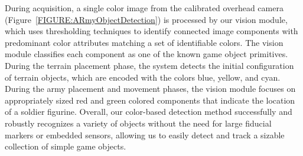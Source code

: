 \documentclass[10pt,twocolumn,letterpaper]{article}
\begin{document}
During acquisition, a single color image from the calibrated overhead camera
(Figure~\ref{FIGURE:ARmyObjectDetection}) is processed by our vision
module, which uses thresholding techniques to identify connected image
components with predominant color attributes matching a set of
identifiable colors. 
%
%
The vision module classifies each component as one of the known game
object primitives.  During the terrain placement phase, the system
detects the initial configuration of terrain objects, which are
encoded with the colors blue, yellow, and cyan.
%
During the army placement and movement phases, the vision module
focuses on appropriately sized red and green colored components that
indicate the location of a soldier figurine.
%
Overall, our color-based detection method successfully and robustly
recognizes a variety of objects without the need for large fiducial
markers or embedded sensors, allowing us to easily detect and track a
sizable collection of simple game objects.
\end{document}
